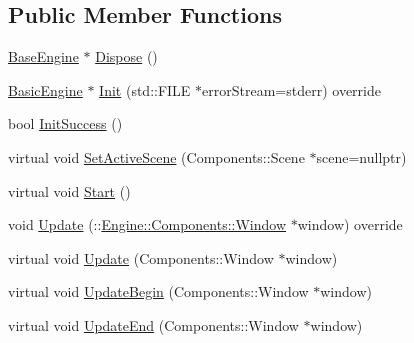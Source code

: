 \subsection*{Public Member Functions}
\begin{DoxyCompactItemize}
\item 
\mbox{\hyperlink{classEngine_1_1BaseEngine_ad838c97afe1790cb35527f0b58e81e6b}{Base\+Engine}} $\ast$ \mbox{\hyperlink{classEngine_1_1BaseEngine_acd5cd5d2189d24e038b23477b7dce405}{Dispose}} ()
\item 
\mbox{\hyperlink{classApplication_1_1Engines_1_1BasicEngine}{Basic\+Engine}} $\ast$ \mbox{\hyperlink{classApplication_1_1Engines_1_1BasicEngine_afbdc9f559d1776371f90da00b61ba6ab}{Init}} (std\+::\+F\+I\+LE $\ast$error\+Stream=stderr) override
\item 
bool \mbox{\hyperlink{classEngine_1_1BaseEngine_a7a1c9b833049b3eb61194cab113dfe89}{Init\+Success}} ()
\item 
virtual void \mbox{\hyperlink{classEngine_1_1BaseEngine_afc82c6a00d5a9d4714740fc5eab5db86}{Set\+Active\+Scene}} (Components\+::\+Scene $\ast$scene=nullptr)
\item 
virtual void \mbox{\hyperlink{classEngine_1_1BaseEngine_a525fdc7a1da7eecb514ad5763f06be79}{Start}} ()
\item 
void \mbox{\hyperlink{classApplication_1_1Engines_1_1BasicEngine_ad628d9878f5008dd7f7f7743a75d5f17}{Update}} (\+::\mbox{\hyperlink{classEngine_1_1Components_1_1Window}{Engine\+::\+Components\+::\+Window}} $\ast$window) override
\item 
virtual void \mbox{\hyperlink{classEngine_1_1BaseEngine_a01c23c2073f08939a660f3b7a866852c}{Update}} (Components\+::\+Window $\ast$window)
\item 
virtual void \mbox{\hyperlink{classEngine_1_1BaseEngine_aace6be2a42d12b64fbd35f1acdb08408}{Update\+Begin}} (Components\+::\+Window $\ast$window)
\item 
virtual void \mbox{\hyperlink{classEngine_1_1BaseEngine_a7c07c98e583df042a0eb01e0ddec85a1}{Update\+End}} (Components\+::\+Window $\ast$window)
\end{DoxyCompactItemize}
